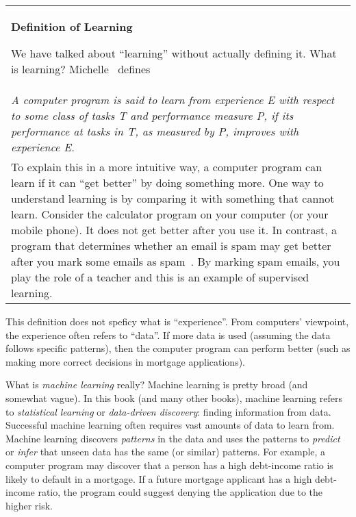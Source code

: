 \vspace{0.1in}\begin{tabular}{p{5in}}
\index{definition of learning}
  \begin{center}
    {\bf Definition of Learning}
 \end{center}

  We have talked about ``learning'' without actually defining it.
  What is learning? Michelle~\cite{Mitchell1997MachineLearning}
  defines

  \\
  
  {\it
    A computer program is said to learn from experience E with respect
    to some class of tasks T and performance measure P, if its
    performance at tasks in T, as measured by P, improves with
    experience E.}

  \\

  To explain this in a more intuitive way, a computer program can
  learn if it can ``get better'' by doing something more.  One way to
  understand learning is by comparing it with something that cannot
  learn. Consider the calculator program on your computer (or your
  mobile phone). It does not get better after you use it.  In
  contrast, a program that determines whether an email is spam may get
  better after you mark some emails as
  spam~\cite{Hastie2009ElementsStatisticalLearning}.  By marking spam
  emails, you play the role of a teacher and this is an example of
  supervised learning.

\end{tabular}\vspace{0.1in}

This definition does not speficy what is ``experience''.  From
computers' viewpoint, the experience often refers to ``data''.  If
more data is used (assuming the data follows specific patterns), then
the computer program can perform better (such as making more correct
decisions in mortgage applications).

What is {\it machine learning} really?  Machine learning is pretty
broad (and somewhat vague).  In this book (and many other books),
machine learning refers to {\it statistical learning} or {\it
  data-driven discovery}: finding information from data.  Successful
machine learning often requires vast amounts of data to learn from.
Machine learning discovers {\it patterns} in the data and uses the
patterns to {\it predict} or {\it infer} that unseen data has the same
(or similar) patterns.  For example, a computer program may discover
that a person has a high debt-income ratio is likely to default in a
mortgage.  If a future mortgage applicant has a high debt-income
ratio, the program could suggest denying the application due to the
higher risk.

